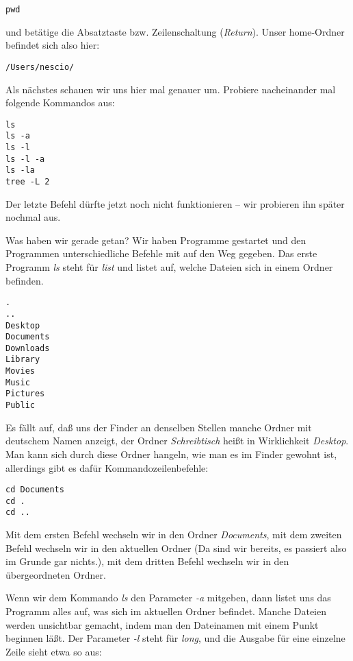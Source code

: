\begin{verbatim}
pwd
\end{verbatim}

\noindent und betätige die Absatztaste bzw. Zeilenschaltung (\emph{Return}). Unser home-Ordner befindet sich also hier:

\begin{verbatim}
/Users/nescio/
\end{verbatim}

\noindent Als nächstes schauen wir uns hier mal genauer um. Probiere nacheinander mal folgende Kommandos aus:

\begin{verbatim}
ls
ls -a
ls -l
ls -l -a
ls -la
tree -L 2
\end{verbatim}

\noindent Der letzte Befehl dürfte jetzt noch nicht funktionieren – wir probieren ihn später nochmal aus.

Was haben wir gerade getan? Wir haben Programme gestartet und den Programmen unterschiedliche Befehle mit auf den Weg gegeben. Das erste Programm \emph{ls} steht für \emph{list} und listet auf, welche Dateien sich in einem Ordner befinden.

\begin{verbatim}
.
..				
Desktop
Documents
Downloads
Library
Movies
Music
Pictures
Public
\end{verbatim}

\noindent Es fällt auf, daß uns der Finder an denselben Stellen manche Ordner mit deutschem Namen anzeigt, der Ordner \emph{Schreibtisch} heißt in Wirklichkeit \emph{Desktop}. Man kann sich durch diese Ordner hangeln, wie man es im Finder gewohnt ist, allerdings gibt es dafür Kommandozeilenbefehle:

\begin{verbatim}
cd Documents
cd .
cd ..
\end{verbatim}

\noindent Mit dem ersten Befehl wechseln wir in den Ordner \emph{Documents}, mit dem zweiten Befehl wechseln wir in den aktuellen Ordner (Da sind wir bereits, es passiert also im Grunde gar nichts.), mit dem dritten Befehl wechseln wir in den übergeordneten Ordner.

Wenn wir dem Kommando \emph{ls} den Parameter \emph{-a} mitgeben, dann listet uns das Programm alles auf, was sich im aktuellen Ordner befindet. Manche Dateien werden unsichtbar gemacht, indem man den Dateinamen mit einem Punkt beginnen läßt. Der Parameter \emph{-l} steht für \emph{long}, und die Ausgabe für eine einzelne Zeile sieht etwa so aus:

